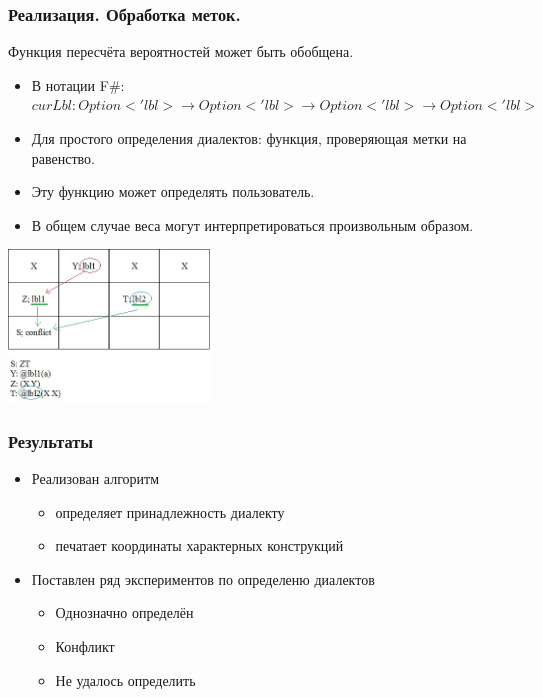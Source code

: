 \documentclass{beamer}
\begin{document}
\begin{frame}
	\transwipe[direction=90]
	\frametitle{Реализация. Обработка меток.}
	Функция пересчёта вероятностей может быть обобщена.
	\begin{itemize}
	    \item В нотации F\#: $curLbl: Option<' \! lbl> \rightarrow Option<'\!lbl> \rightarrow Option<'\!lbl> \rightarrow Option<'\!lbl>$
        \item Для простого определения диалектов: функция, проверяющая метки на равенство.
        \item Эту функцию может определять пользователь.
        \item В общем случае веса могут интерпретироваться произвольным образом.
    \end{itemize}
    \begin{center}
        {\includegraphics[width= 0.4\textwidth, height=0.4\textheight]{diagrams/table.png}}
    \end{center}
\end{frame}    

\begin{frame}
	\transwipe[direction=90]
	\frametitle{Результаты}
	\begin{itemize}
        \item Реализован алгоритм
        	\begin{itemize}
        	    \item определяет принадлежность диалекту
        	    \item печатает координаты характерных конструкций
    	    \end{itemize}
            \item Поставлен ряд экспериментов по определеню диалектов
        	\begin{itemize}
                \item Однозначно определён
                \item Конфликт
                \item Не удалось определить
            \end{itemize}
    \end{itemize}
\end{frame}    
\end{document}
